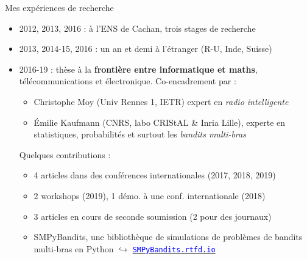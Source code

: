 \documentclass[11pt,english,ignorenonframetext,]{beamer}
\providecommand{\tightlist}{%
  \setlength{\itemsep}{0pt}\setlength{\parskip}{0pt}}
\begin{document}
\begin{frame}{Mes expériences de recherche}

\pause

\begin{itemize}
\item
  2012, 2013, 2016 : à l'ENS de Cachan, trois stages de recherche
\item
  2013, 2014-15, 2016 : un an et demi à l'étranger (R-U, Inde, Suisse)

\pause
\item
  2016-19 : thèse à la \textbf{frontière entre \textcolor{info}{informatique} et \textcolor{maths}{maths}},
  télécommunications et électronique. Co-encadrement par :

  \begin{itemize}
  \tightlist
  \item
    Christophe Moy (Univ Rennes 1, IETR) expert en \emph{radio intelligente}
  \item
    Émilie Kaufmann (CNRS, labo CRIStAL \& Inria Lille), experte en \textcolor{maths}{statistiques, probabilités} et surtout \textcolor{ml}{les \emph{bandits multi-bras}}
  \end{itemize}

  \pause
  Quelques contributions :

  \begin{itemize}
  \tightlist
  \item
    4 articles dans des conférences internationales (2017, 2018, 2019)
  \item
    2 workshops (2019), 1 démo. à une conf. internationale (2018)
  \item
    3 articles en cours de seconde soumission (2 pour des journaux)
  \item
    SMPyBandits, une bibliothèque de simulations de problèmes de bandits multi-bras en Python
    $\hookrightarrow$ \href{https://SMPyBandits.rtfd.io/}{\textcolor{blue}{\texttt{SMPyBandits.rtfd.io}}}
  \end{itemize}
\end{itemize}

\end{frame}


\end{document}
